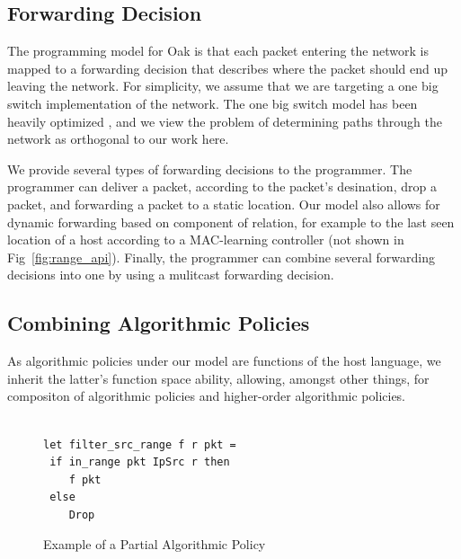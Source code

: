 \documentclass[preprint]{sigplanconf}
\begin{document}
   

     
  

   \subsection*{Forwarding Decision}
	The programming model for Oak is that each packet entering the network is mapped to a forwarding decision that describes where the packet should end up leaving the network. For simplicity, we assume that we are targeting a one big switch implementation of the network. The one big switch model has been heavily optimized \cite{Obs}, and we view the problem of determining paths through the network as orthogonal to our work here. 
  
   We provide several types of forwarding decisions to the programmer. The programmer can deliver a packet, according to the packet's desination, drop a packet, and forwarding a packet to a static location. Our model also allows for dynamic forwarding based on component of relation, for example to the last seen location of a host according to a MAC-learning controller (not shown in Fig~\ref{fig:range_api}). Finally, the programmer can combine several forwarding decisions into one by using a mulitcast forwarding decision.
   

   \subsection*{Combining Algorithmic Policies}
   As algorithmic policies under our model are functions of the host language, we inherit the latter's function space ability, allowing, amongst other things, for compositon of algorithmic policies and higher-order algorithmic policies.

\begin{figure}[ht]
\begin{lstlisting}

let filter_src_range f r pkt =
 if in_range pkt IpSrc r then
    f pkt
 else
    Drop   
\end{lstlisting}

\caption{Example of a Partial Algorithmic Policy}
\label{fig:ex-hole}
\end{figure}
\end{document}

